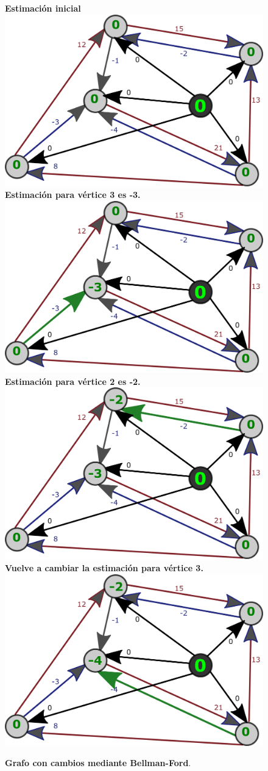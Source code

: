 \documentclass[../tp2_grupo404.tex]{subfiles}
\begin{document}
\begin{figure}[H]
    \centering
    \subcaptionbox
        {\label{fig:FordCambios0}\textbf{Estimación inicial}}
        {\includegraphics[width=0.4\linewidth,angle=0,origin=c]{out/ford/ford1C.png}}
    \subcaptionbox
        {\label{fig:FordCambios1}\textbf{Estimación para vértice 3 es -3.}}
        {\includegraphics[width=0.4\linewidth,angle=0,origin=c]{out/ford/ford1D.png}}
    \centering
    \subcaptionbox
        {\label{fig:FordCambios2}\textbf{Estimación para vértice 2 es -2.}}
        {\includegraphics[width=0.4\linewidth,angle=0,origin=c]{out/ford/ford1E.png}}
    \subcaptionbox
        {\label{fig:FordCambios3}\textbf{Vuelve a cambiar la estimación para vértice 3.}}
        {\includegraphics[width=0.4\linewidth,angle=0,origin=c]{out/ford/ford1F.png}}
        \caption{\label{fig:EjFord1Cambios}\textbf{Grafo con cambios mediante Bellman-Ford}.}
\end{figure}
\end{document}
